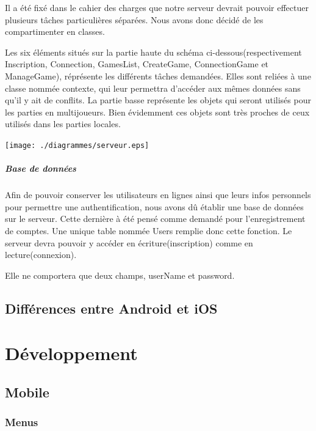 \documentclass[a4paper,11pt]{report}
\begin{document}
			Il a été fixé dans le cahier des charges que notre serveur devrait pouvoir
			effectuer plusieurs tâches particulières séparées. Nous avons donc décidé de
			les compartimenter en classes.
			
			Les six éléments situés sur la partie haute du schéma
			ci-dessous(respectivement Inscription, Connection, GamesList, CreateGame,
			ConnectionGame et ManageGame), réprésente les différents tâches demandées.
			Elles sont reliées à une classe nommée contexte, qui leur permettra d'accéder
			aux mêmes données sans qu'il y ait de conflits. La partie basse représente les
			objets qui seront utilisés pour les parties en multijoueurs. Bien évidemment
			ces objets sont très proches de ceux utilisés dans les parties locales.
		
			\begin{center}
					\texttt{[image: ./diagrammes/serveur.eps]}
			\end{center}
			
			
			\paragraph{Base de données\\}
			Afin de pouvoir conserver les utilisateurs en lignes ainsi que leurs infos
			personnels pour permettre une authentification, nous avons dû établir une
			base de données sur le serveur. Cette dernière à été pensé comme demandé pour 
			l'enregistrement de comptes. Une unique table nommée Users remplie donc cette
			fonction. Le serveur devra pouvoir y accéder en écriture(inscription) comme
			en lecture(connexion).
			
			Elle ne comportera que deux champs, userName et password.
						
	\section{Différences entre Android et iOS}
	


\chapter{Développement}
	\section{Mobile}
		\subsection{Menus}
\end{document}
